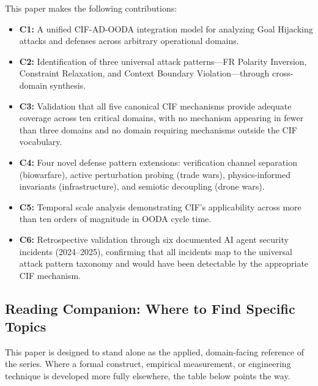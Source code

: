 \documentclass[
]{article}
\providecommand{\tightlist}{%
  \setlength{\itemsep}{0pt}\setlength{\parskip}{0pt}}
\begin{document}
This paper makes the following contributions:

\begin{itemize}
\tightlist
\item
  \textbf{C1:} A unified CIF-AD-OODA integration model for analyzing
  Goal Hijacking attacks and defenses across arbitrary operational
  domains.
\item
  \textbf{C2:} Identification of three universal attack patterns---FR
  Polarity Inversion, Constraint Relaxation, and Context Boundary
  Violation---through cross-domain synthesis.
\item
  \textbf{C3:} Validation that all five canonical CIF mechanisms provide
  adequate coverage across ten critical domains, with no mechanism
  appearing in fewer than three domains and no domain requiring
  mechanisms outside the CIF vocabulary.
\item
  \textbf{C4:} Four novel defense pattern extensions: verification
  channel separation (biowarfare), active perturbation probing (trade
  wars), physics-informed invariants (infrastructure), and semiotic
  decoupling (drone wars).
\item
  \textbf{C5:} Temporal scale analysis demonstrating CIF's applicability
  across more than ten orders of magnitude in OODA cycle time.
\item
  \textbf{C6:} Retrospective validation through six documented AI agent
  security incidents (2024--2025), confirming that all incidents map to
  the universal attack pattern taxonomy and would have been detectable
  by the appropriate CIF mechanism.
\end{itemize}

\subsection{Reading Companion: Where to Find Specific
Topics}\label{sec:applications-reading-companion}

This paper is designed to stand alone as the applied, domain-facing
reference of the series. Where a formal construct, empirical
measurement, or engineering technique is developed more fully elsewhere,
the table below points the way.
\end{document}
